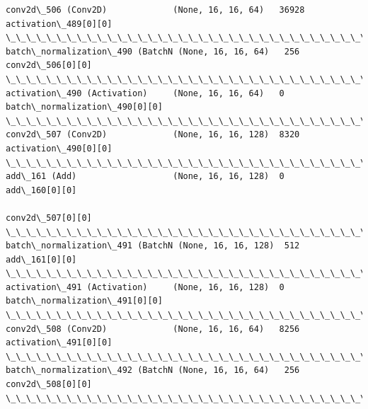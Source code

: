 \documentclass[11pt]{article}
\begin{document}
\begin{Verbatim}[commandchars=\\\{\}]
conv2d\_506 (Conv2D)             (None, 16, 16, 64)   36928       activation\_489[0][0]             
\_\_\_\_\_\_\_\_\_\_\_\_\_\_\_\_\_\_\_\_\_\_\_\_\_\_\_\_\_\_\_\_\_\_\_\_\_\_\_\_\_\_\_\_\_\_\_\_\_\_\_\_\_\_\_\_\_\_\_\_\_\_\_\_\_\_\_\_\_\_\_\_\_\_\_\_\_\_\_\_\_\_\_\_\_\_\_\_\_\_\_\_\_\_\_\_\_\_
batch\_normalization\_490 (BatchN (None, 16, 16, 64)   256         conv2d\_506[0][0]                 
\_\_\_\_\_\_\_\_\_\_\_\_\_\_\_\_\_\_\_\_\_\_\_\_\_\_\_\_\_\_\_\_\_\_\_\_\_\_\_\_\_\_\_\_\_\_\_\_\_\_\_\_\_\_\_\_\_\_\_\_\_\_\_\_\_\_\_\_\_\_\_\_\_\_\_\_\_\_\_\_\_\_\_\_\_\_\_\_\_\_\_\_\_\_\_\_\_\_
activation\_490 (Activation)     (None, 16, 16, 64)   0           batch\_normalization\_490[0][0]    
\_\_\_\_\_\_\_\_\_\_\_\_\_\_\_\_\_\_\_\_\_\_\_\_\_\_\_\_\_\_\_\_\_\_\_\_\_\_\_\_\_\_\_\_\_\_\_\_\_\_\_\_\_\_\_\_\_\_\_\_\_\_\_\_\_\_\_\_\_\_\_\_\_\_\_\_\_\_\_\_\_\_\_\_\_\_\_\_\_\_\_\_\_\_\_\_\_\_
conv2d\_507 (Conv2D)             (None, 16, 16, 128)  8320        activation\_490[0][0]             
\_\_\_\_\_\_\_\_\_\_\_\_\_\_\_\_\_\_\_\_\_\_\_\_\_\_\_\_\_\_\_\_\_\_\_\_\_\_\_\_\_\_\_\_\_\_\_\_\_\_\_\_\_\_\_\_\_\_\_\_\_\_\_\_\_\_\_\_\_\_\_\_\_\_\_\_\_\_\_\_\_\_\_\_\_\_\_\_\_\_\_\_\_\_\_\_\_\_
add\_161 (Add)                   (None, 16, 16, 128)  0           add\_160[0][0]                    
                                                                 conv2d\_507[0][0]                 
\_\_\_\_\_\_\_\_\_\_\_\_\_\_\_\_\_\_\_\_\_\_\_\_\_\_\_\_\_\_\_\_\_\_\_\_\_\_\_\_\_\_\_\_\_\_\_\_\_\_\_\_\_\_\_\_\_\_\_\_\_\_\_\_\_\_\_\_\_\_\_\_\_\_\_\_\_\_\_\_\_\_\_\_\_\_\_\_\_\_\_\_\_\_\_\_\_\_
batch\_normalization\_491 (BatchN (None, 16, 16, 128)  512         add\_161[0][0]                    
\_\_\_\_\_\_\_\_\_\_\_\_\_\_\_\_\_\_\_\_\_\_\_\_\_\_\_\_\_\_\_\_\_\_\_\_\_\_\_\_\_\_\_\_\_\_\_\_\_\_\_\_\_\_\_\_\_\_\_\_\_\_\_\_\_\_\_\_\_\_\_\_\_\_\_\_\_\_\_\_\_\_\_\_\_\_\_\_\_\_\_\_\_\_\_\_\_\_
activation\_491 (Activation)     (None, 16, 16, 128)  0           batch\_normalization\_491[0][0]    
\_\_\_\_\_\_\_\_\_\_\_\_\_\_\_\_\_\_\_\_\_\_\_\_\_\_\_\_\_\_\_\_\_\_\_\_\_\_\_\_\_\_\_\_\_\_\_\_\_\_\_\_\_\_\_\_\_\_\_\_\_\_\_\_\_\_\_\_\_\_\_\_\_\_\_\_\_\_\_\_\_\_\_\_\_\_\_\_\_\_\_\_\_\_\_\_\_\_
conv2d\_508 (Conv2D)             (None, 16, 16, 64)   8256        activation\_491[0][0]             
\_\_\_\_\_\_\_\_\_\_\_\_\_\_\_\_\_\_\_\_\_\_\_\_\_\_\_\_\_\_\_\_\_\_\_\_\_\_\_\_\_\_\_\_\_\_\_\_\_\_\_\_\_\_\_\_\_\_\_\_\_\_\_\_\_\_\_\_\_\_\_\_\_\_\_\_\_\_\_\_\_\_\_\_\_\_\_\_\_\_\_\_\_\_\_\_\_\_
batch\_normalization\_492 (BatchN (None, 16, 16, 64)   256         conv2d\_508[0][0]                 
\_\_\_\_\_\_\_\_\_\_\_\_\_\_\_\_\_\_\_\_\_\_\_\_\_\_\_\_\_\_\_\_\_\_\_\_\_\_\_\_\_\_\_\_\_\_\_\_\_\_\_\_\_\_\_\_\_\_\_\_\_\_\_\_\_\_\_\_\_\_\_\_\_\_\_\_\_\_\_\_\_\_\_\_\_\_\_\_\_\_\_\_\_\_\_\_\_\_

\end{Verbatim}
\end{document}
